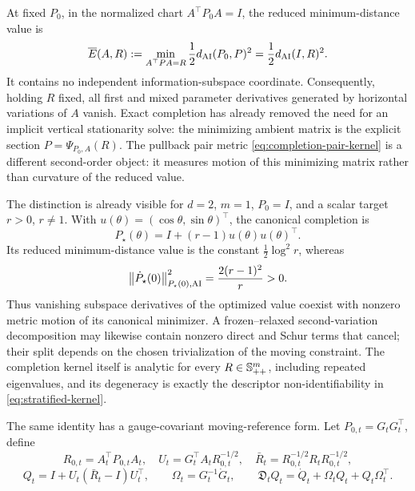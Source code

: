 \begin{corollary}
\label{cor:reduced-completion-value}
At fixed \(P_0\), in the normalized chart \(A^\top P_0A=I\), the reduced
minimum-distance value is
\begin{equation}
  \overline E(A,R)
  :=\min_{A^\top PA=R}\frac12d_{\mathrm{AI}}(P_0,P)^2
  =\frac12d_{\mathrm{AI}}(I,R)^2.
  \label{eq:reduced-completion-energy}
\end{equation}
It contains no independent information-subspace coordinate.  Consequently,
holding \(R\) fixed, all first and mixed parameter derivatives generated by
horizontal variations of \(A\) vanish.  Exact completion has already removed
the need for an implicit vertical stationarity solve: the minimizing ambient
matrix is the explicit section \(P=\Psi_{P_0,A}(R)\).  The pullback pair
metric \eqref{eq:completion-pair-kernel} is a different second-order object:
it measures motion of this minimizing matrix rather than curvature of the
reduced value.
\end{corollary}

\begin{remark}
\label{rem:value-versus-motion}
The distinction is already visible for \(d=2\), \(m=1\), \(P_0=I\), and a
scalar target \(r>0\), \(r\ne1\).  With
\(u(\theta)=(\cos\theta,\sin\theta)^\top\), the canonical completion is
\[
  P_\star(\theta)=I+(r-1)u(\theta)u(\theta)^\top.
\]
Its reduced minimum-distance value is the constant
\(\tfrac12\log^2r\), whereas
\[
  \left\lVert \dot P_\star(0)\right\rVert_{P_\star(0),\mathrm{AI}}^2
  =\frac{2(r-1)^2}{r}>0.
\]
Thus vanishing subspace derivatives of the optimized value coexist with
nonzero metric motion of its canonical minimizer.  A frozen--relaxed
second-variation decomposition may likewise contain nonzero direct and
Schur terms that cancel; their split depends on the chosen trivialization of
the moving constraint.  The completion kernel itself is analytic for every
\(R\in\mathbb S_{++}^m\), including repeated eigenvalues, and its degeneracy is exactly
the descriptor non-identifiability in \eqref{eq:stratified-kernel}.
\end{remark}

The same identity has a gauge-covariant moving-reference form.  Let
\(P_{0,t}=G_tG_t^\top\), define
\[
  R_{0,t}=A_t^\top P_{0,t}A_t,
  \quad
  U_t=G_t^\top A_tR_{0,t}^{-1/2},
  \quad
  \bar R_t=R_{0,t}^{-1/2}R_tR_{0,t}^{-1/2},
\]
\[
  Q_t=I+U_t(\bar R_t-I)U_t^\top,
  \qquad
  \Omega_t=G_t^{-1}\dot G_t,
  \qquad
  \mathfrak D_tQ_t=\dot Q_t+\Omega_tQ_t+Q_t\Omega_t^\top.
\]

